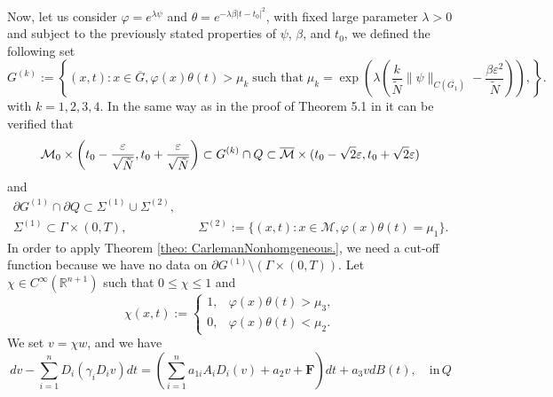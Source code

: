 \documentclass[11pt,oneside,leqno]{amsart}
\numberwithin{equation}{section}
\numberwithin{equation}{section}
\begin{document}
Now, let us consider $\varphi = e^{\lambda \psi}$ and $\theta = e^{-\lambda \beta |t - t_0|^2}$, with fixed large parameter $\lambda>0$ and subject to the previously stated properties of $\psi$, $\beta$, and $t_0$, we defined the following set
\begin{equation}
    G^{(k)}:=\left\{(x,t):x\in \overline{G}, \varphi(x)\theta(t)>\mu_{k}\;\text{such that}\; \mu_{k}=\exp{\left(\lambda\left(\frac{k}{\tilde{N}}\|\psi\|_{C(\overline{G_1})}-\frac{\beta\varepsilon^2}{\tilde{N}}\right)\right)},\right\}.
\end{equation}
with $k=1,2,3,4$.
In the same way as in the proof of Theorem 5.1 in \cite{Yamamoto_2009} it can be verified that
\begin{equation}\label{eq:propertyonewight}
    \mathcal{M}_0\times\left(t_0-\frac{\varepsilon}{\sqrt{\Tilde{N}}},t_0+\frac{\varepsilon}{\sqrt{\Tilde{N}}}\right)\subset G^{(k)}\cap Q\subset \overline{\mathcal{M}}\times (t_0-\sqrt{2}\varepsilon,t_0+\sqrt{2}\varepsilon)
\end{equation}
and
\begin{equation}\label{eq:propertytwoweight}
    \begin{split}
        \partial G^{(1)}\cap\partial Q\subset \Sigma^{(1)}\cup \Sigma^{(2)},&\\
        \Sigma^{(1)}\subset \Gamma\times(0,T),\quad &\quad\Sigma^{(2)}:=\{(x,t):x\in \mathcal{M}, \varphi(x)\theta(t)=\mu_1\}.
    \end{split}
\end{equation}
In order to apply Theorem \ref{theo: CarlemanNonhomgeneous.}, we need a cut-off function because we have no data on $\partial G^{(1)}\setminus (\Gamma\times(0,T))$. Let $\chi\in C^{\infty}(\mathbb{R}^{n+1})$ such that $0\leq \chi \leq 1$ and
\begin{equation}\label{eq:definitionchi}
    \chi(x,t):=\left\{ \begin{array}{cc}
     1,    &\varphi(x)\theta(t)>\mu_3,  \\
     0,    &\varphi(x)\theta(t)<\mu_2. 
    \end{array}\right.
\end{equation}
We set $v=\chi w$, and we have
\begin{equation*}
    dv-\sum_{i=1}^{n}D_i(\gamma_iD_i v)dt=\left(\sum_{i=1}^{n}a_{1i}A_iD_i(v)+a_2v+\mathbf{F}\right)dt+a_3vdB(t),\quad \text{in}\, Q
\end{equation*}
\end{document}
